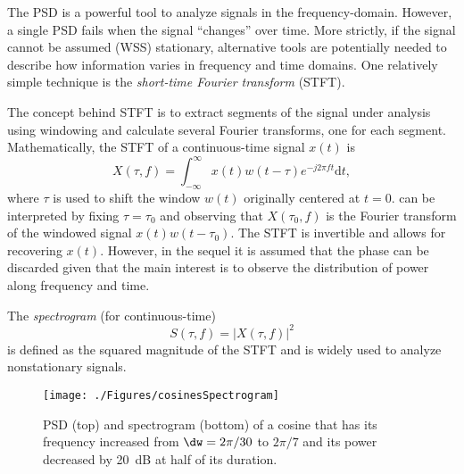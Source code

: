 The PSD is a powerful tool to analyze signals in the frequency-domain. However, a single PSD fails when the signal ``changes'' over time. More strictly, if the signal cannot be assumed (WSS) stationary, alternative tools are potentially needed to describe how information varies in frequency and time domains. One relatively simple technique is the \emph{short-time Fourier transform} (STFT).

The concept behind STFT is to extract segments of the signal under analysis using windowing and calculate several Fourier transforms, one for each segment. Mathematically, the STFT of a continuous-time signal $x(t)$ is
\begin{equation}
X(\tau,f) = \int_{-\infty}^{\infty} x(t) w(t-\tau) e^{-j 2 \pi f t} \textrm{d}t,
\label{eq:stft}
\end{equation}
where $\tau$ is used to shift the window $w(t)$ originally centered at $t=0$.
 can be interpreted by fixing $\tau = \tau_0$ and observing that $X(\tau_0,f)$ is the Fourier transform of the windowed signal $x(t) w(t-\tau_0)$. The STFT is invertible and allows for recovering $x(t)$. However, in the sequel it is assumed that the phase can be discarded given that the main interest is to observe the distribution of power along frequency and time.

The \emph{spectrogram} (for continuous-time) 
\begin{equation}
S(\tau,f) = |X(\tau,f)|^2
\label{eq:spectrogram}
\end{equation}
is defined as the squared magnitude of the STFT and is widely used to analyze nonstationary signals. 

\begin{figure}[htbp]
\centering
\texttt{[image: ./Figures/cosinesSpectrogram]}
\caption{PSD (top) and spectrogram (bottom) of a cosine that has its frequency increased from $\dw=2\pi/30$ to $2\pi/7$ and its power decreased by 20~dB at half of its duration.\label{fig:cosinesSpectrogram}}
\end{figure}

